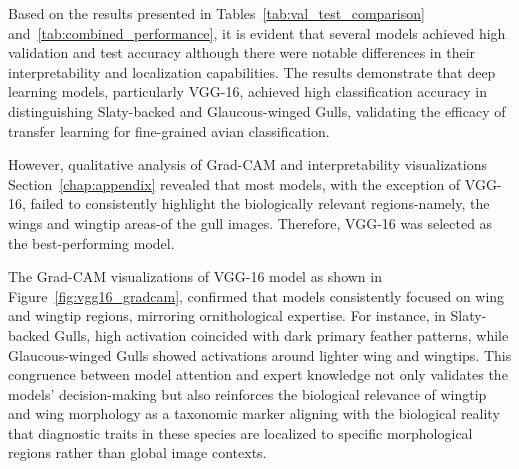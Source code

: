 \documentclass[a4paper,12pt]{report}
\begin{document}
\begin{table}[H]
    \centering
    \caption{Comprehensive Model Performance Metrics on Test Dataset}
    \label{tab:combined_performance}
\end{table}

Based on the results presented in Tables~\ref{tab:val_test_comparison} and~\ref{tab:combined_performance}, it is evident that several models achieved high validation and test accuracy although there were notable differences in their interpretability and localization capabilities. The results demonstrate that deep learning models, particularly VGG-16, achieved high classification accuracy in distinguishing Slaty-backed and Glaucous-winged Gulls, validating the efficacy of transfer learning for fine-grained avian classification.

However, qualitative analysis of Grad-CAM and interpretability visualizations Section~\ref{chap:appendix} revealed that most models, with the exception of VGG-16, failed to consistently highlight the biologically relevant regions-namely, the wings and wingtip areas-of the gull images. Therefore, VGG-16 was selected as the best-performing model.

The Grad-CAM visualizations of VGG-16 model as shown in Figure~\ref{fig:vgg16_gradcam}, confirmed that models consistently focused on wing and wingtip regions, mirroring ornithological expertise. For instance, in Slaty-backed Gulls, high activation coincided with dark primary feather patterns, while Glaucous-winged Gulls showed activations around lighter wing and wingtips. This congruence between model attention and expert knowledge not only validates the models’ decision-making but also reinforces the biological relevance of wingtip and wing morphology as a taxonomic marker aligning with the biological reality that diagnostic traits in these species are localized to specific morphological regions rather than global image contexts.
\end{document}
